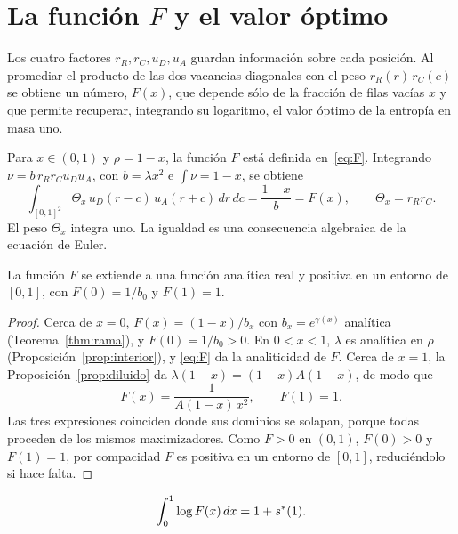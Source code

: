 \section{La función \texorpdfstring{$F$}{F} y el valor óptimo}\label{sec:F}

Los cuatro factores $r_R,r_C,u_D,u_A$ guardan información sobre cada posición. Al promediar
el producto de las dos vacancias diagonales con el peso $r_R(r)\,r_C(c)$ se
obtiene un número, $F(x)$, que depende sólo de la fracción de filas vacías $x$ y que permite
recuperar, integrando su logaritmo, el valor óptimo de la entropía en masa uno.

Para $x\in(0,1)$ y $\rho=1-x$, la función $F$ está definida en~\eqref{eq:F}. Integrando
$\nu=b\,r_Rr_Cu_Du_A$, con $b=\lambda x^2$ e $\int\nu=1-x$, se obtiene
\begin{equation}\label{eq:F_integral}
 \int_{[0,1]^2}\Theta_x\,u_D(r-c)\,u_A(r+c)\,dr\,dc=\frac{1-x}{b}=F(x),\qquad \Theta_x=r_Rr_C .
\end{equation}
El peso $\Theta_x$ integra uno. La igualdad es una consecuencia algebraica de la ecuación de Euler.

\begin{teorema}[Analiticidad de $F$]\label{thm:F}
La función $F$ se extiende a una función analítica real y positiva en un entorno de $[0,1]$, con
$F(0)=1/b_0$ y $F(1)=1$.
\end{teorema}

\begin{proof}
Cerca de $x=0$, $F(x)=(1-x)/b_x$ con $b_x=e^{\gamma(x)}$ analítica (Teorema~\ref{thm:rama}), y
$F(0)=1/b_0>0$. En $0<x<1$, $\lambda$ es analítica en $\rho$ (Proposición~\ref{prop:interior}), y
\eqref{eq:F} da la analiticidad de $F$. Cerca de $x=1$, la Proposición~\ref{prop:diluido} da
$\lambda(1-x)=(1-x)A(1-x)$, de modo que
\[
 F(x)=\frac1{A(1-x)\,x^2},\qquad F(1)=1 .
\]
Las tres expresiones coinciden donde sus dominios se solapan, porque todas proceden de los mismos
maximizadores. Como $F>0$ en $(0,1)$, $F(0)>0$ y $F(1)=1$, por compacidad $F$ es positiva en un
entorno de $[0,1]$, reduciéndolo si hace falta.
\end{proof}

\begin{proposicion}\label{prop:intlogF}
\[
 \int_0^1\log F(x)\,dx=1+s^{*}(1).
\]
\end{proposicion}

